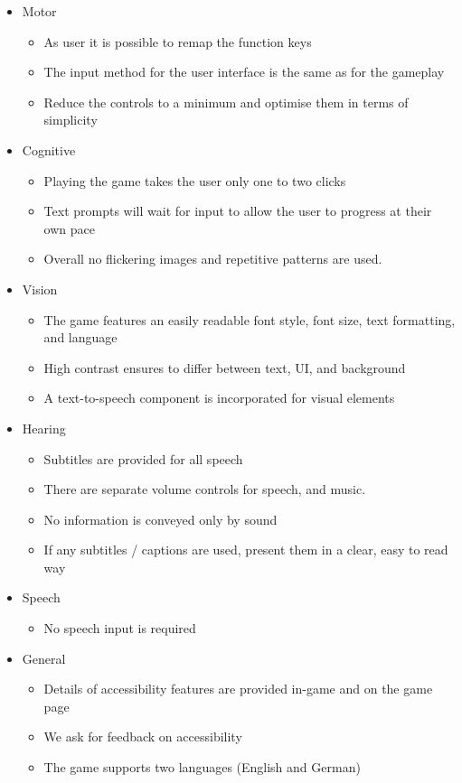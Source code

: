 \documentclass[a4paper]{scrreprt}
\begin{document}
\begin{itemize}
    \item Motor
    \begin{itemize}
        \item As user it is possible to remap the function keys
        \item The input method for the user interface is the same as for the gameplay
        \item Reduce the controls to a minimum and optimise them in terms of simplicity
    \end{itemize}
    \item Cognitive
    \begin{itemize}
        \item Playing the game takes the user only one to two clicks
        \item Text prompts will wait for input to allow the user to progress at their own pace
        \item Overall no flickering images and repetitive patterns are used.
    \end{itemize}
    \item Vision
    \begin{itemize} 
        \item The game features an easily readable font style, font size, text formatting, and language
        \item High contrast ensures to differ between text, UI, and background
        \item A text-to-speech component is incorporated for visual elements
    \end{itemize}
    \item Hearing
    \begin{itemize}
        \item Subtitles are provided for all speech
        \item There are separate volume controls for speech, and music.
        \item No information is conveyed only by sound
        \item If any subtitles / captions are used, present them in a clear, easy to read way
    \end{itemize}
    \item Speech
    \begin{itemize}
        \item No speech input is required
    \end{itemize}
    \item General
    \begin{itemize}
        \item Details of accessibility features are provided in-game and on the game page
        \item We ask for feedback on accessibility
        \item The game supports two languages (English and German)
    \end{itemize}
\end{itemize}
\end{document}
